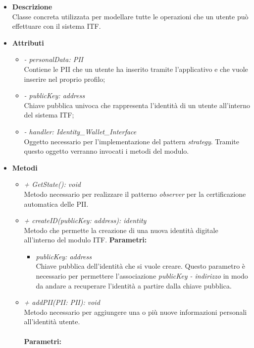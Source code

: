 \begin{itemize}
	\item \textbf{Descrizione}\\
	Classe concreta utilizzata per modellare tutte le operazioni che un utente può effettuare con il sistema \gls{ITF}.
	\item \textbf{Attributi}
	\begin{itemize}
		\item \textit{- personalData: PII}\\
		Contiene le \gls{PII} che un utente ha inserito tramite l'applicativo e che vuole inserire nel proprio profilo;
		\item \textit{- publicKey: address}\\
		Chiave pubblica univoca che rappresenta l'identità di un utente all'interno del sistema \gls{ITF};
		\item \textit{- handler: Identity\_Wallet\_Interface}\\
		Oggetto necessario per l'implementazione del pattern \textit{strategy}. Tramite questo oggetto verranno invocati i metodi del modulo.
	\end{itemize}
	\item \textbf{Metodi}
	\begin{itemize}
		\item \textit{+ GetState(): void}\\
		Metodo necessario per realizzare il patterno \textit{observer} per la certificazione automatica delle \gls{PII}.
		\item \textit{+ createID(publicKey: address): identity}\\
		Metodo che permette la creazione di una nuova identità digitale all'interno del modulo \gls{ITF}.
		\textbf{Parametri:}
		\begin{itemize}
			\item \textit{publicKey: address}\\
			Chiave pubblica dell'identità che si vuole creare. Questo parametro è necessario per permettere l'associazione \textit{publicKey - indirizzo} in modo da andare a recuperare l'identità a partire dalla chiave pubblica.
		\end{itemize}
		\item \textit{+ addPII(PII: PII): void}\\
		Metodo necessario per aggiungere una o più nuove informazioni personali all'identità utente.\\\\
		\textbf{Parametri:}
		\begin{itemize}

\end{itemize}
\end{itemize}
\end{itemize}
